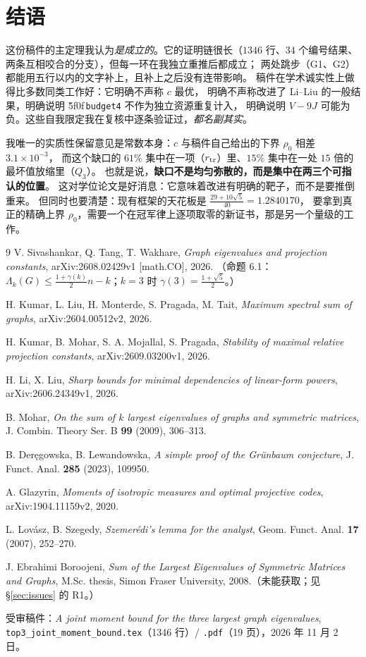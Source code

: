 \documentclass[UTF8,11pt]{ctexart}
\theoremstyle{definition}
\newcommand{\peq}[1]{\textup{\u5f0f}\,\texttt{#1}}
\begin{document}
\section*{结语}

这份稿件的主定理我认为\emph{是成立的}。它的证明链很长（$1346$ 行、$34$ 个编号结果、
两条互相咬合的分支），但每一环在我独立重推后都成立；
两处跳步（G1、G2）都能用五行以内的文字补上，且补上之后没有连带影响。
稿件在学术诚实性上做得比多数同类工作好：它明确不声称 $c$ 最优，
明确不声称改进了 Li--Liu 的一般结果，明确说明 \peq{budget4} 不作为独立资源重复计入，
明确说明 $V-9J$ 可能为负。这些自我限定我在复核中逐条验证过，\emph{都名副其实}。

我唯一的实质性保留意见是常数本身：$c$ 与稿件自己给出的下界 $\rho_0$ 相差 $3.1\times10^{-3}$，
而这个缺口的 $61\%$ 集中在一项（$r_{\rm tr}$）里、$15\%$ 集中在一处 $15$ 倍的最坏值放缩里（$Q_3$）。
也就是说，\textbf{缺口不是均匀弥散的，而是集中在两三个可指认的位置}。
这对学位论文是好消息：它意味着改进有明确的靶子，而不是要推倒重来。
但同时也要清楚：现有框架的天花板是 $\frac{29+10\sqrt5}{40}=1.2840170$，
要拿到真正的精确上界 $\rho_0$，需要一个在冠军律上逐项取零的新证书，那是另一个量级的工作。

\begin{thebibliography}{9}
V. Sivashankar, Q. Tang, T. Wakhare,
\emph{Graph eigenvalues and projection constants},
arXiv:2608.02429v1 [math.CO], 2026.
（命题 6.1：$\Lambda_k(G)\le\frac{1+\gamma(k)}2n-k$；$k=3$ 时 $\gamma(3)=\frac{1+\sqrt5}2$。）

H. Kumar, L. Liu, H. Monterde, S. Pragada, M. Tait,
\emph{Maximum spectral sum of graphs},
arXiv:2604.00512v2, 2026.

H. Kumar, B. Mohar, S. A. Mojallal, S. Pragada,
\emph{Stability of maximal relative projection constants},
arXiv:2609.03200v1, 2026.

H. Li, X. Liu,
\emph{Sharp bounds for minimal dependencies of linear-form powers},
arXiv:2606.24349v1, 2026.

B. Mohar,
\emph{On the sum of $k$ largest eigenvalues of graphs and symmetric matrices},
J. Combin. Theory Ser. B \textbf{99} (2009), 306--313.

B. Der\k{e}gowska, B. Lewandowska,
\emph{A simple proof of the Gr\"unbaum conjecture},
J. Funct. Anal. \textbf{285} (2023), 109950.

A. Glazyrin,
\emph{Moments of isotropic measures and optimal projective codes},
arXiv:1904.11159v2, 2020.

L. Lov\'asz, B. Szegedy,
\emph{Szemer\'edi's lemma for the analyst},
Geom. Funct. Anal. \textbf{17} (2007), 252--270.

J. Ebrahimi Boroojeni,
\emph{Sum of the Largest Eigenvalues of Symmetric Matrices and Graphs},
M.Sc. thesis, Simon Fraser University, 2008.（未能获取；见 \S\ref{sec:issues} 的 R1。）

受审稿件：\emph{A joint moment bound for the three largest graph eigenvalues},
\texttt{top3\_joint\_moment\_bound.tex}（1346 行）/ \texttt{.pdf}（19 页），2026 年 11 月 2 日。
\end{thebibliography}
\end{document}
